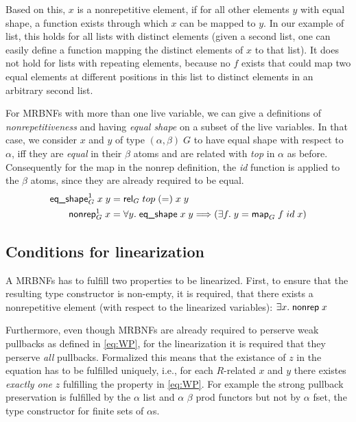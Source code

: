     Based on this, $x$ is a nonrepetitive element, if for all other elements $y$ with equal shape, a function exists through which $x$ can be mapped to $y$. In our example of \textsf{list}, this holds for all lists with distinct elements (given a second list, one can easily define a function mapping the distinct elements of $x$ to that list). It does not hold for lists with repeating elements, because no $f$ exists that could map two equal elements at different positions in this list to distinct elements in an arbitrary second list.

    For \acp{MRBNF} with more than one live variable, we can give a definitions of \textit{nonrepetitiveness} and having \textit{equal shape} on a subset of the live variables. In that case, we consider $x$ and $y$ of type $(\alpha, \beta)\; G$ to have equal shape with respect to $\alpha$, iff they are \textit{equal} in their $\beta$ atoms and are related with \textit{top} in $\alpha$ as before. Consequently for the map in the \textsf{nonrep} definition, the \textit{id} function is applied to the $\beta$ atoms, since they are already required to be equal. 
    \begin{align}
      \text{\textsf{eq\_shape}}_G^1\; x\; y &= \text{\textsf{rel}}_G\; top\; (=)\; x\; y\\
      \text{\textsf{nonrep}}_G^1\; x &= \forall y.\; \text{\textsf{eq\_shape}}\; x\; y \Longrightarrow (\exists f.\; y = \text{\textsf{map}}_G\; f\; id\; x)
    \end{align}
    
    
  \subsection{Conditions for linearization}
  \label{subsec:conditions}
    A \acp{MRBNF} has to fulfill two properties to be linearized. First, to ensure that the resulting type constructor is non-empty, it is required, that there exists a nonrepetitive element (with respect to the linearized variables): $\exists x.\; \text{\textsf{nonrep}}\; x$

    Furthermore, even though \acp{MRBNF} are already required to perserve weak pullbacks as defined in \autoref{eq:WP}, for the linearization it is required that they perserve \textit{all} pullbacks. Formalized this means that the existance of $z$ in the equation has to be fulfilled uniquely, i.e., for each $R$-related $x$ and $y$ there existes \textit{exactly one} $z$ fulfilling the property in \autoref{eq:WP}. For example the strong pullback preservation is fulfilled by the \textsf{$\alpha$ list} and \textsf{$\alpha$ $\beta$ prod} functors but not by \textsf{$\alpha$ fset}, the type constructor for finite sets of $\alpha$s. 

